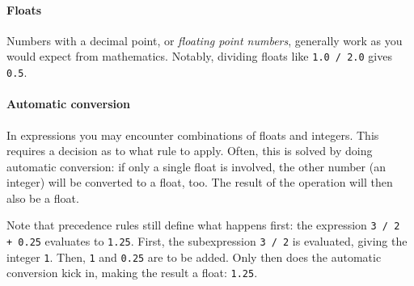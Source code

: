 \paragraph{Floats}

Numbers with a decimal point, or \emph{floating point numbers}, generally work as you would expect from mathematics. Notably, dividing floats like \texttt{1.0\,/\,2.0} gives \texttt{0.5}.

\paragraph{Automatic conversion}

In expressions you may encounter combinations of floats and integers. This requires a decision as to what rule to apply. Often, this is solved by doing automatic conversion: if only a single float is involved, the other number (an integer) will be converted to a float, too. The result of the operation will then also be a float.

Note that precedence rules still define what happens first: the expression \texttt{3\,/\,2\,+\,0.25} evaluates to \texttt{1.25}. First, the subexpression \texttt{3\,/\,2} is evaluated, giving the integer \texttt{1}. Then, \texttt{1} and \texttt{0.25} are to be added. Only then does the automatic conversion kick in, making the result a float: \texttt{1.25}.
